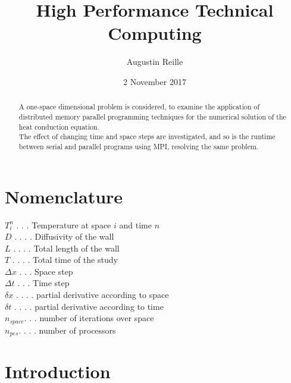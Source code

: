 \documentclass{article}
\title{High Performance Technical Computing}
\author{Augustin Reille}
\date{2 November 2017}
\begin{document}
        \maketitle
    
        \begin{abstract}
            A one-space dimensional problem is considered, to examine the application
            of distributed memory parallel programming techniques for the numerical 
            solution of the heat conduction equation.\\
            The effect of changing time and space steps are investigated, and so is the runtime
            between serial and parallel programs using MPI, resolving the same problem.
        \end{abstract}
    
        \newpage
        \tableofcontents
    
        \newpage
        \listoffigures
    
        \listoftables
    
        \lstlistoflistings
    
        \section*{Nomenclature}
            $T_i^n$ . . . Temperature at space $i$ and time $n$\\
            $D$ . . . . Diffusivity of the wall\\
            $L$ . . . . Total length of the wall\\
            $T$ . . . . Total time of the study\\
            $\Delta x$ . . . Space step\\
            $\Delta t$ . . . Time step\\
            $\delta x$ . . . . partial derivative according to space\\
            $\delta t$ . . . . partial derivative according to time\\
            $n_{space}$. . .  number of iterations over space\\
            $n_{pes}$. . . . number of processors\\
        \newpage
        \section{Introduction}
    
\end{document}
